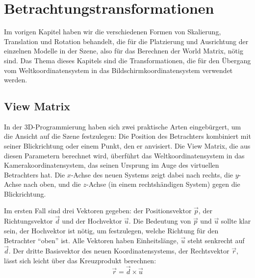 \chapter{Betrachtungstransformationen}
\label{viewingtransformations}
Im vorigen Kapitel haben wir die verschiedenen Formen von Skalierung, Translation und Rotation behandelt, die für die Platzierung und Ausrichtung der einzelnen Modelle in der Szene, also für das Berechnen der World Matrix, nötig sind. Das Thema dieses Kapitels sind die Transformationen, die für den Übergang vom Weltkoordinatensystem in das Bildschirmkoordinatensystem verwendet werden.

\section{View Matrix}
\label{view}
In der 3D-Programmierung haben sich zwei praktische Arten eingebürgert, um die Ansicht auf die Szene festzulegen: Die Position des Betrachters kombiniert mit seiner Blickrichtung oder einem Punkt, den er anvisiert. Die View Matrix, die aus diesen Parametern berechnet wird, überführt das Weltkoordinatensystem in das Kamerakoordinatensystem, das seinen Ursprung im Auge des virtuellen Betrachters hat. Die $x$-Achse des neuen Systems zeigt dabei nach rechts, die $y$-Achse nach oben, und die $z$-Achse (in einem rechtshändigen System) gegen die Blickrichtung.

Im ersten Fall sind drei Vektoren gegeben: der Positionsvektor $\vec p$, der Richtungsvektor $\vec d$ und der Hochvektor $\vec u$. Die Bedeutung von $\vec p$ und $\vec u$ sollte klar sein, der Hochvektor ist nötig, um festzulegen, welche Richtung für den Betrachter \enquote{oben} ist. Alle Vektoren haben Einheitslänge, $\vec u$ steht senkrecht auf $\vec d$. Der dritte Basisvektor des neuen Koordinatensystems, der Rechtsvektor $\vec r$, lässt sich leicht über das Kreuzprodukt berechnen:
\begin{equation}
 \vec r = \vec d \times \vec u
\end{equation}

